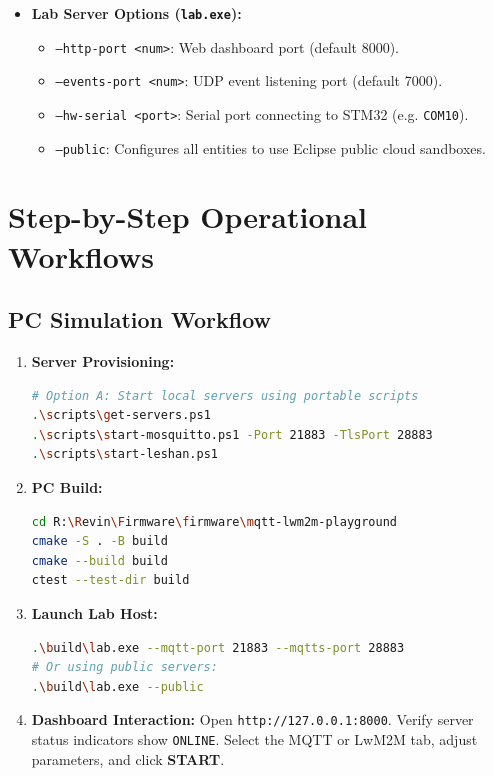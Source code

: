 \documentclass[11pt,a4paper]{article}
\newcommand{\code}[1]{\texttt{#1}}
\begin{document}
\begin{itemize}
\begin{itemize}
      \item \code{--notify-non}: Transmits notifications as Non-confirmable (NON).
      \item \code{--ack-timeout <dur>}: CoAP retransmission timeout (default 2~s).
    \end{itemize}
  \item \textbf{Lab Server Options (\code{lab.exe}):}
    \begin{itemize}
      \item \code{--http-port <num>}: Web dashboard port (default 8000).
      \item \code{--events-port <num>}: UDP event listening port (default 7000).
      \item \code{--hw-serial <port>}: Serial port connecting to STM32 (e.g. \code{COM10}).
      \item \code{--public}: Configures all entities to use Eclipse public cloud sandboxes.
    \end{itemize}
\end{itemize}

\section{Step-by-Step Operational Workflows}

\subsection{PC Simulation Workflow}
\begin{enumerate}
  \item \textbf{Server Provisioning:}
    \begin{lstlisting}[language=bash]
# Option A: Start local servers using portable scripts
.\scripts\get-servers.ps1
.\scripts\start-mosquitto.ps1 -Port 21883 -TlsPort 28883
.\scripts\start-leshan.ps1
    \end{lstlisting}
  \item \textbf{PC Build:}
    \begin{lstlisting}[language=bash]
cd R:\Revin\Firmware\firmware\mqtt-lwm2m-playground
cmake -S . -B build
cmake --build build
ctest --test-dir build
    \end{lstlisting}
  \item \textbf{Launch Lab Host:}
    \begin{lstlisting}[language=bash]
.\build\lab.exe --mqtt-port 21883 --mqtts-port 28883
# Or using public servers:
.\build\lab.exe --public
    \end{lstlisting}
  \item \textbf{Dashboard Interaction:} Open \code{http://127.0.0.1:8000}. Verify server status indicators show \code{ONLINE}. Select the MQTT or LwM2M tab, adjust parameters, and click \textbf{START}.
\end{enumerate}
\end{document}
